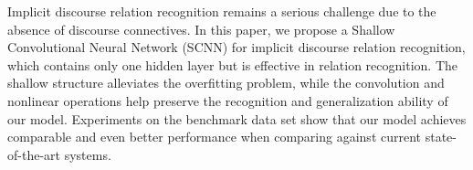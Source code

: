 Implicit discourse relation recognition remains a serious challenge due to the absence of discourse connectives. In this paper, we propose a Shallow Convolutional Neural Network (SCNN) for implicit discourse relation recognition, which contains only one hidden layer but is effective in relation recognition. The shallow structure alleviates the overfitting problem, while the convolution and nonlinear operations help preserve the recognition and generalization ability of our model. Experiments on the benchmark data set show that our model achieves comparable and even better performance when comparing against current state-of-the-art systems.
